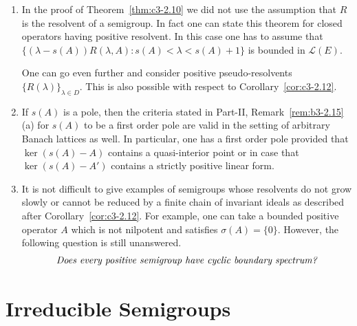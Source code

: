\begin{remarks}\label{rem:c3-2.15}
\begin{enumerate}[\upshape (i), wide, labelindent=.25em]	
	\item 
	In the proof of Theorem~\ref{thm:c3-2.10} we did not use the assumption that $R$ is the resolvent of a semigroup.
	In fact one can state this theorem for closed operators having positive resolvent.
	In this case one has to assume that  
    $\{(\lambda-s(A))R(\lambda,A) \colon s(A) < \lambda < s(A)+1\}$
    is bounded in $\mathcal{L}(E)$.
	
	One can go even further and consider positive pseudo-resolvents 
    $\{R(\lambda)\}_{\lambda\in D}$.
	This is also possible with respect to Corollary~\ref{cor:c3-2.12}.
	
	\item 
	If\/ $s(A)$ is a pole, then the criteria stated in Part-II, Remark~\ref{rem:b3-2.15}\,(a) for $s(A)$ to be a first order pole are valid in the setting of arbitrary Banach lattices as well.
	In particular, one has a first order pole provided that $\ker(s(A) - A)$ contains a quasi-interior point or in case that $\ker(s(A) - A')$ contains a strictly positive linear form.
	
	\item 
	It is not difficult to give examples of semigroups whose resolvents do not grow slowly or cannot be reduced by a finite chain of invariant ideals as described after Corollary~\ref{cor:c3-2.12}.
	For example, one can take a bounded positive operator $A$ which is not nilpotent and satisfies $\sigma(A) = \{0\}$.
	However, the following question is still unanswered.
	\begin{equation*}
		\textit{Does every positive semigroup have cyclic boundary spectrum?}\index{boundary spectrum!cyclic}
	\end{equation*}
\end{enumerate}
\end{remarks}
\section{Irreducible Semigroups}\label{sec:c3-3}

